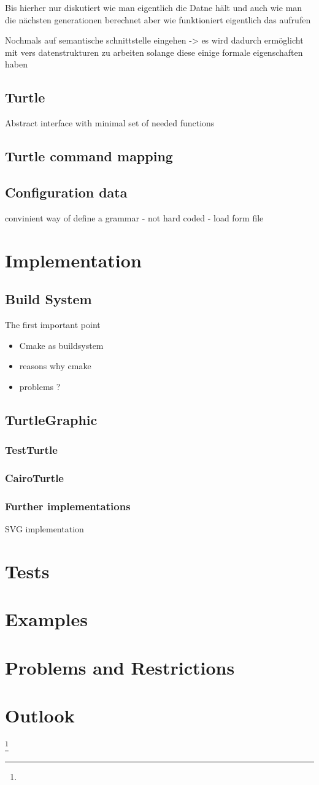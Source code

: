 \documentclass[english]{cpp-hmwk}
\begin{document}
Bis hierher nur diskutiert wie man eigentlich die Datne hält und auch wie man die nächsten generationen berechnet aber wie funktioniert eigentlich das aufrufen 


Nochmals auf semantische schnittstelle eingehen -> es wird dadurch ermöglicht mit vers datenstrukturen zu arbeiten solange diese einige formale eigenschaften haben


\subsection{Turtle}
Abstract interface with minimal set of needed functions

\subsection{Turtle command mapping}

\subsection{Configuration data}
convinient way of define a grammar - not hard coded - load form file


\section{Implementation}
\subsection{Build System}
\label{section:buildsystem}
The first important point 

\begin{itemize}
	\item Cmake as buildsystem
	\item reasons why cmake
	\item problems ?
\end{itemize}


\subsection{TurtleGraphic}
\subsubsection{TestTurtle}
\subsubsection{CairoTurtle}
\subsubsection{Further implementations}
SVG implementation


\section{Tests}
\section{Examples}
\section{Problems and Restrictions}
\section{Outlook}
\footnote{}
\end{document}
